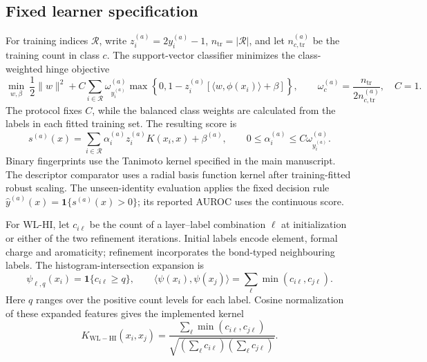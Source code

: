 \subsection*{Fixed learner specification}
For training indices \(\mathcal R\), write \(z_i^{(a)}=2y_i^{(a)}-1\), \(n_{\mathrm{tr}}=|\mathcal R|\), and let \(n_{c,\mathrm{tr}}^{(a)}\) be the training count in class \(c\). The support-vector classifier minimizes the class-weighted hinge objective
\begin{equation}
\min_{w,\beta}\ \frac12\|w\|^2+
C\sum_{i\in\mathcal R}
\omega_{y_i^{(a)}}^{(a)}
\max\!\left\{0,1-z_i^{(a)}
\left[\langle w,\phi(x_i)\rangle+\beta\right]\right\},
\qquad
\omega_c^{(a)}=\frac{n_{\mathrm{tr}}}{2n_{c,\mathrm{tr}}^{(a)}},
\quad C=1.
\label{eq:si-svm-objective}
\end{equation}
The protocol fixes \(C\), while the balanced class weights are calculated from the labels in each fitted training set. The resulting score is
\begin{equation}
s^{(a)}(x)=\sum_{i\in\mathcal R}
\alpha_i^{(a)}z_i^{(a)}K(x_i,x)+\beta^{(a)},
\qquad
0\leq\alpha_i^{(a)}\leq C\omega_{y_i^{(a)}}^{(a)}.
\label{eq:si-svm-score}
\end{equation}
Binary fingerprints use the Tanimoto kernel specified in the main manuscript. The descriptor comparator uses a radial basis function kernel after training-fitted robust scaling. The unseen-identity evaluation applies the fixed decision rule \(\widehat y^{(a)}(x)=\mathbf1\{s^{(a)}(x)>0\}\); its reported AUROC uses the continuous score.

For WL-HI, let \(c_{i\ell}\) be the count of a layer--label combination \(\ell\) at initialization or either of the two refinement iterations. Initial labels encode element, formal charge and aromaticity; refinement incorporates the bond-typed neighbouring labels. The histogram-intersection expansion is
\begin{equation}
\psi_{\ell,q}(x_i)=\mathbf1\{c_{i\ell}\geq q\},
\qquad
\langle\psi(x_i),\psi(x_j)\rangle
=\sum_\ell\min(c_{i\ell},c_{j\ell}).
\label{eq:si-hi-expansion}
\end{equation}
Here \(q\) ranges over the positive count levels for each label. Cosine normalization of these expanded features gives the implemented kernel
\begin{equation}
K_{\mathrm{WL-HI}}(x_i,x_j)=
\frac{\sum_\ell\min(c_{i\ell},c_{j\ell})}
{\sqrt{\left(\sum_\ell c_{i\ell}\right)
\left(\sum_\ell c_{j\ell}\right)}}.
\label{eq:si-wl-kernel}
\end{equation}


